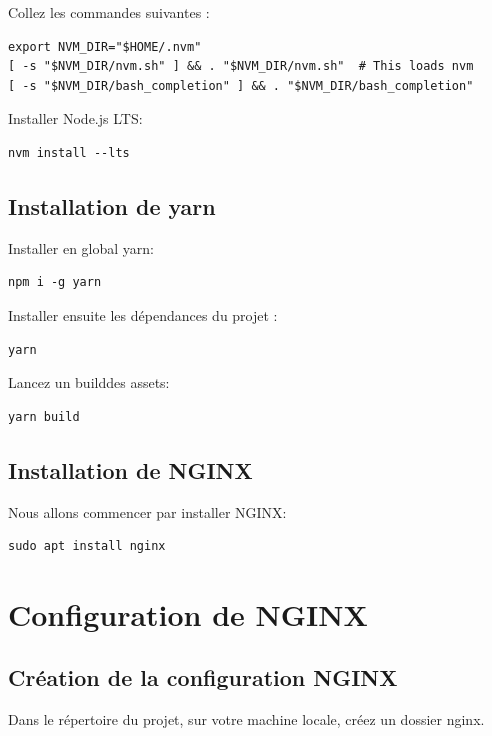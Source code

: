 \documentclass{article}
\begin{document}
Collez les commandes suivantes :
\begin{verbatim}
export NVM_DIR="$HOME/.nvm"
[ -s "$NVM_DIR/nvm.sh" ] && . "$NVM_DIR/nvm.sh"  # This loads nvm
[ -s "$NVM_DIR/bash_completion" ] && . "$NVM_DIR/bash_completion"
\end{verbatim}

Installer Node.js LTS:
\begin{verbatim}
nvm install --lts
\end{verbatim}

\subsection{Installation de yarn}
Installer en global yarn:
\begin{verbatim}
npm i -g yarn
\end{verbatim}

Installer ensuite les dépendances du projet :
\begin{verbatim}
yarn
\end{verbatim}

Lancez un builddes assets:
\begin{verbatim}
yarn build
\end{verbatim}

\subsection{Installation de NGINX}
Nous allons commencer par installer NGINX:
\begin{verbatim}
sudo apt install nginx
\end{verbatim}


\section{Configuration de NGINX}
\subsection{Création de la configuration NGINX}
Dans le répertoire du projet, sur votre machine locale, créez un dossier nginx.
\end{document}
